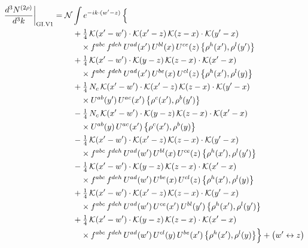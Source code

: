 \documentclass[10pt]{article}
\numberwithin{equation}{section}
\newcommand{\KK}{\mathcal K}
\newcommand{\NN}{\mathcal N}
\begin{document}
\begin{align}
\frac{d^3N^{(2\rho)}}{d^3k}\bigg|_{\rm GI.V1}={}&\NN\int e^{-ik\cdot(w'-z)}\,\Big\{\notag\\
&\quad +\tfrac14\,\KK(x'-w')\cdot\KK(x'-z)\,\KK(z-x)\cdot\KK(y'-x)\notag\\
&\qquad\times f^{abc}\,f^{deh}\,U^{ad}(x')\,U^{bl}(x)\,U^{ce}(z)\,\big\{\rho^{h}(x'),\rho^{l}(y')\big\}\notag\\
&\quad +\tfrac14\,\KK(x'-w')\cdot\KK(y-z)\,\KK(z-x)\cdot\KK(x'-x)\notag\\
&\qquad\times f^{abc}\,f^{deh}\,U^{ad}(x')\,U^{be}(x)\,U^{cl}(z)\,\big\{\rho^{h}(x'),\rho^{l}(y)\big\}\notag\\
&\quad +\tfrac14\,N_{c}\,\KK(x'-w')\cdot\KK(x'-z)\,\KK(z-x)\cdot\KK(y'-x)\notag\\
&\qquad\times U^{ab}(y')\,U^{ac}(x')\,\big\{\rho^{c}(x'),\rho^{b}(y')\big\}\notag\\
&\quad -\tfrac14\,N_{c}\,\KK(x'-w')\cdot\KK(y-z)\,\KK(z-x)\cdot\KK(x'-x)\notag\\
&\qquad\times U^{ab}(y)\,U^{ac}(x')\,\big\{\rho^{c}(x'),\rho^{b}(y)\big\}\notag\\
&\quad -\tfrac14\,\KK(x'-w')\cdot\KK(x'-z)\,\KK(z-x)\cdot\KK(y'-x)\notag\\
&\qquad\times f^{abc}\,f^{deh}\,U^{ad}(w')\,U^{bl}(x)\,U^{ce}(z)\,\big\{\rho^{h}(x'),\rho^{l}(y')\big\}\notag\\
&\quad -\tfrac14\,\KK(x'-w')\cdot\KK(y-z)\,\KK(z-x)\cdot\KK(x'-x)\notag\\
&\qquad\times f^{abc}\,f^{deh}\,U^{ad}(w')\,U^{be}(x)\,U^{cl}(z)\,\big\{\rho^{h}(x'),\rho^{l}(y)\big\}\notag\\
&\quad +\tfrac14\,\KK(x'-w')\cdot\KK(x'-z)\,\KK(z-x)\cdot\KK(y'-x)\notag\\
&\qquad\times f^{abc}\,f^{deh}\,U^{ad}(w')\,U^{ce}(x')\,U^{bl}(y')\,\big\{\rho^{h}(x'),\rho^{l}(y')\big\}\notag\\
&\quad +\tfrac14\,\KK(x'-w')\cdot\KK(y-z)\,\KK(z-x)\cdot\KK(x'-x)\notag\\
&\qquad\times f^{abc}\,f^{deh}\,U^{ad}(w')\,U^{cl}(y)\,U^{be}(x')\,\big\{\rho^{h}(x'),\rho^{l}(y)\big\}\Big\}+\big(w'\leftrightarrow z\big)\label{R:eq:sum-GI.V1}
\end{align}
\end{document}
